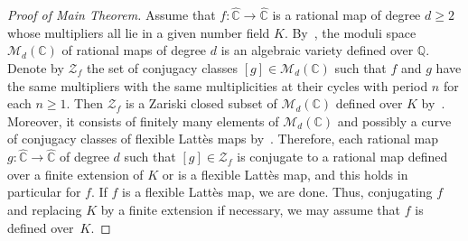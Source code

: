 \begin{proof}[Proof of Main Theorem]
Assume that $f \colon \widehat{\mathbb{C}} \to \widehat{\mathbb{C}}$ is a rational map of degree $d \geq 2$ whose multipliers all lie in a given number field $K$. By~\cite[Th.\,2.1]{S1998}, the moduli space $\mathcal{M}_{d}(\mathbb{C})$ of rational maps of degree $d$ is an algebraic variety defined over $\mathbb{Q}$. Denote by $\mathcal{Z}_{f}$ the set of conjugacy classes $[g] \in \mathcal{M}_{d}(\mathbb{C})$ such that $f$ and $g$ have the same multipliers with the same multiplicities at their cycles with period $n$ for each $n \geq 1$. Then $\mathcal{Z}_{f}$ is a Zariski closed subset of $\mathcal{M}_{d}(\mathbb{C})$ defined over $K$ by~\cite[Th.\,4.5]{S1998}. Moreover, it consists of finitely many elements of $\mathcal{M}_{d}(\mathbb{C})$ and possibly a curve of conjugacy classes of flexible Lattès maps by~\cite[Cor.\,2.3]{MM1987}. Therefore, each rational map $g \colon \widehat{\mathbb{C}} \to \widehat{\mathbb{C}}$ of degree $d$ such that $[g] \in \mathcal{Z}_{f}$ is conjugate to a rational map defined over a finite extension of $K$ or is a flexible Lattès map, and this holds in particular for $f$. If $f$ is a flexible Lattès map, we are done. Thus, conjugating $f$ and replacing $K$ by a finite extension if necessary, we may assume that $f$ is defined over~$K$.


\end{proof}
